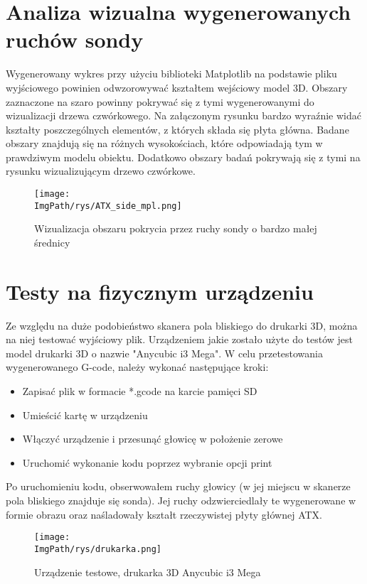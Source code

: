 \documentclass[a4paper,12pt,twoside,openany]{report}
\newcommand{\ImgPath}{.}
\begin{document}
  \section{Analiza wizualna wygenerowanych ruchów sondy}
    Wygenerowany wykres przy użyciu biblioteki Matplotlib na podstawie pliku wyjściowego powinien odwzorowywać kształtem 
    wejściowy model 3D. Obszary zaznaczone na szaro powinny pokrywać się z tymi wygenerowanymi do wizualizacji drzewa czwórkowego.
    Na załączonym rysunku bardzo wyraźnie widać kształty poszczególnych elementów, z których składa się płyta główna. Badane obszary 
    znajdują się na różnych wysokościach, które odpowiadają tym w prawdziwym modelu obiektu. Dodatkowo obszary badań pokrywają się z tymi 
    na rysunku wizualizującym drzewo czwórkowe.
    \begin{figure}[!htbp]
      \begin{center}
    \centering
    \texttt{[image: \\ImgPath/rys/ATX\_side\_mpl.png]}
    \end{center}
      \caption{Wizualizacja obszaru pokrycia przez ruchy sondy o bardzo małej średnicy}
      \label{ATXSrmap}
    \end{figure}
    \clearpage
  \section{Testy na fizycznym urządzeniu}
    Ze względu na duże podobieństwo skanera pola bliskiego do drukarki 3D, można na niej testować wyjściowy plik. Urządzeniem jakie zostało użyte do testów jest model 
    drukarki 3D o nazwie "Anycubic i3 Mega". W celu przetestowania wygenerowanego G-code, należy wykonać 
    następujące kroki:
    \begin{itemize}
      \item Zapisać plik w formacie *.gcode na karcie pamięci SD
      \item Umieścić kartę w urządzeniu
      \item Włączyć urządzenie i przesunąć głowicę w położenie zerowe
      \item Uruchomić wykonanie kodu poprzez wybranie opcji print
    \end{itemize} 
    Po uruchomieniu kodu, obserwowałem ruchy głowicy (w jej miejscu w skanerze pola bliskiego znajduje się sonda). Jej ruchy odzwierciedlały te wygenerowane w formie obrazu 
    oraz naśladowały kształt rzeczywistej płyty głównej ATX.
    \begin{figure}[!htbp]
      \begin{center}
    \centering
    \texttt{[image: \\ImgPath/rys/drukarka.png]}
    \end{center}
      \caption{Urządzenie testowe, drukarka 3D Anycubic i3 Mega}
      \label{drukarka}
    \end{figure}
    \clearpage
\end{document}
